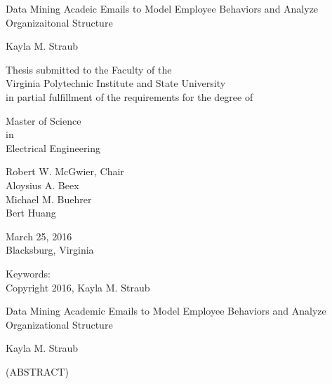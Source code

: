 \documentclass[12pt,dvips]{report}
\begin{document}
\thispagestyle{empty}
\begin{center}

{\Large 
Data Mining Acadeic Emails to Model Employee Behaviors and Analyze Organizaitonal Structure
}

\vfill

Kayla M. Straub

\vfill

Thesis submitted to the Faculty of the \\
Virginia Polytechnic Institute and State University \\
in partial fulfillment of the requirements for the degree of

\vfill

Master of Science \\
in \\
Electrical Engineering
\vfill

Robert W. McGwier, Chair \\
Aloysius A. Beex\\
Michael M. Buehrer\\
Bert Huang

\vfill

March 25, 2016 \\
Blacksburg, Virginia

\vfill

Keywords: 
\\
Copyright 2016, Kayla M. Straub

\end{center}

\pagebreak

\thispagestyle{empty}
\begin{center}

{\large Data Mining Academic Emails to Model Employee Behaviors and Analyze Organizational Structure}

\vfill

Kayla M. Straub

\vfill

(ABSTRACT)

\vfill

\end{center}
\end{document}
